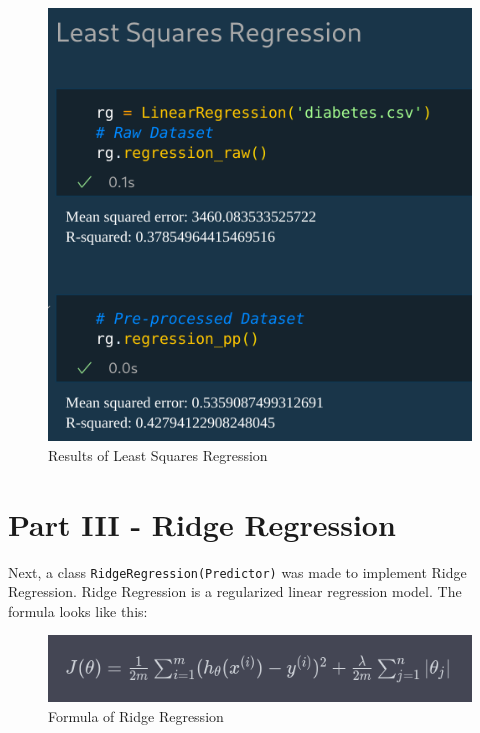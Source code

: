 \documentclass{CPSReport}
\begin{document}
\begin{figure}[ht]
    \begin{center}
        \includegraphics[width=1\linewidth]{pics/Result_Least_Squares.png}
    \end{center}
    \caption{Results of Least Squares Regression}
    \label{fig:res_LS}
\end{figure}

\section{Part III - Ridge Regression}
Next, a class \texttt{RidgeRegression(Predictor)} was made to implement Ridge Regression. Ridge Regression is a regularized linear regression model. The formula looks like this:

\begin{figure}[ht]
    \begin{center}
        \includegraphics[width=1\linewidth]{pics/Formula_Ridge.png}
    \end{center}
    \caption{Formula of Ridge Regression}
    \label{fig:form_Ridge}
\end{figure}
\end{document}
